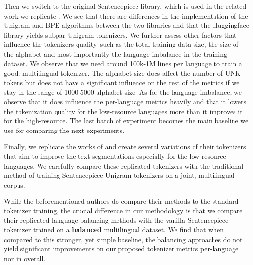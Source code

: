 Then we switch to the original Sentencepiece library, which is used in the related work we replicate \cite{conneau_unsupervised_2020,chung_improving_2020,zheng_allocating_2021,liang_xlm-v_2023}. We see that there are differences in the implementation of the Unigram and BPE algorithms between the two libraries and that the Huggingface library yields subpar Unigram tokenizers. We further assess other factors that influence the tokenizers quality, such as the total training data size, the size of the alphabet and most importantly the language imbalance in the training dataset. We observe that we need around 100k-1M lines per language to train a good, multilingual tokenizer. The alphabet size does affect the number of UNK tokens but does not have a significant influence on the rest of the metrics if we stay in the range of 1000-5000 alphabet size. As for the language imbalance, we observe that it does influence the per-language metrics heavily and that it lowers the tokenization quality for the low-resource languages more than it improves it for the high-resource. The last batch of experiment becomes the main baseline we use for comparing the next experiments.

Finally, we replicate the works of \citet{chung_improving_2020,zheng_allocating_2021,liang_xlm-v_2023} and create several variations of their tokenizers that aim to improve the text segmentations especially for the low-resource languages. We carefully compare these replicated tokenizers with the traditional method of training Sentencepiece Unigram tokenizers on a joint, multilingual corpus. 

While the beforementioned authors do compare their methods to the standard tokenizer training, the crucial difference in our methodology is that we compare their replicated language-balancing methods with the vanilla Sentencepiece tokenizer trained on a \textbf{balanced} multilingual dataset. We find that when compared to this stronger, yet simple baseline, the balancing approaches do not yield significant improvements on our proposed tokenizer metrics per-language nor in overall.


